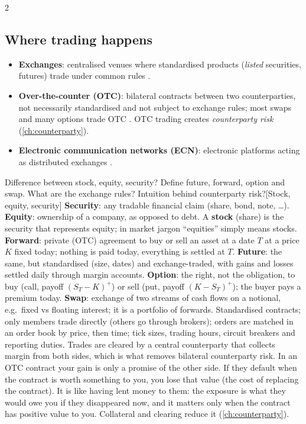 \begin{paracol}{2}
\subsection{Where trading happens}
\begin{itemize}
  \item \textbf{Exchanges}: centralised venues where standardised products (\emph{listed}
        securities, futures) trade under common rules .
  \item \textbf{Over-the-counter (OTC)}: bilateral contracts between two counterparties,
        not necessarily standardised and not subject to exchange rules; most swaps and many
        options trade OTC . OTC trading creates \emph{counterparty risk}
        (\cref{ch:counterparty}).
  \item \textbf{Electronic communication networks (ECN)}: electronic platforms acting as
        distributed exchanges .
\end{itemize}
\begin{answer}{Difference between stock, equity, security? Define future, forward, option and swap. What are the exchange rules? Intuition behind counterparty risk?}[Stock, equity, security]
\textbf{Security}: any tradable financial claim (share, bond, note, \dots).
        \textbf{Equity}: ownership of a company, as opposed to debt. A \textbf{stock} (share) is the
        security that represents equity; in market jargon ``equities'' simply means stocks.
\label{ans:derivatives}
\textbf{Forward}: private (OTC) agreement to buy or sell an asset at a date $T$ at a price
        $K$ fixed today; nothing is paid today, everything is settled at $T$.
        \textbf{Future}: the same, but standardised (size, dates) and exchange-traded, with gains and
        losses settled daily through margin accounts. \textbf{Option}: the right, not the
        obligation, to buy (call, payoff $(S_T-K)^+$) or sell (put, payoff $(K-S_T)^+$); the buyer
        pays a premium today. \textbf{Swap}: exchange of two streams of cash flows on a notional,
        e.g.\ fixed vs floating interest; it is a portfolio of forwards.
Standardised contracts; only members trade directly (others go
        through brokers); orders are matched in an order book by price, then time; tick sizes,
        trading hours, circuit breakers and reporting duties. Trades are cleared by a central
        counterparty that collects margin from both sides, which is what removes bilateral
        counterparty risk.
In an OTC contract your gain is only a promise of the other
        side. If they default when the contract is worth something to you, you lose that value
        (the cost of replacing the contract). It is like having lent money to them: the exposure is
        what they would owe you if they disappeared now, and it matters only when the contract has
        positive value to you. Collateral and clearing reduce it (\cref{ch:counterparty}).
\end{answer}


\end{paracol}
